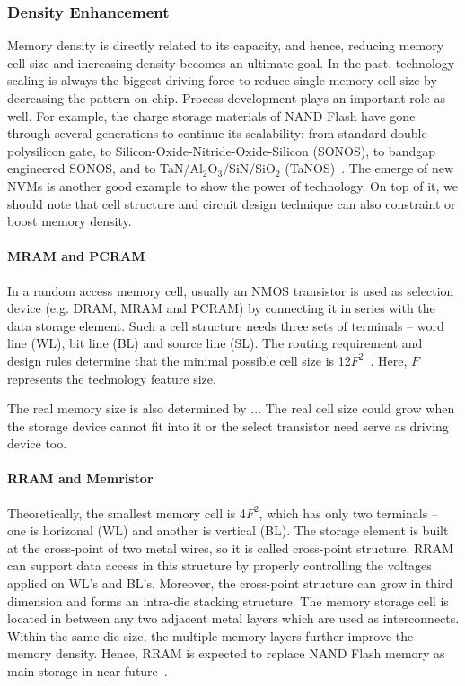\subsubsection{Density Enhancement}

Memory density is directly related to its capacity, and hence, reducing memory cell size and increasing density becomes an ultimate goal. In the past, technology scaling is always the biggest driving force to reduce single memory cell size by decreasing the pattern on chip. Process development plays an important role as well. For example, the charge storage materials of NAND Flash have gone through several generations to continue its scalability: from standard double polysilicon gate, to Silicon-Oxide-Nitride-Oxide-Silicon (SONOS), to bandgap engineered SONOS, and to TaN/Al$_2$O$_3$/SiN/SiO$_2$ (TaNOS)~\cite{Lu09}. The emerge of new NVMs is another good example to show the power of technology. On top of it, we should note that cell structure and circuit design technique can also constraint or boost memory density.

\paragraph{MRAM and PCRAM}

In a random access memory cell, usually an NMOS transistor is used as selection device (e.g. DRAM, MRAM and PCRAM) by connecting it in series with the data storage element. Such a cell structure needs three sets of terminals -- word line (WL), bit line (BL) and source line (SL). The routing requirement and design rules determine that the minimal possible cell size is 12$F^2$~\cite{Li09}. Here, $F$ represents the technology feature size.

The real memory size is also determined by ...
The real cell size could grow when the storage device cannot fit into it or the select transistor need serve as driving device too.



\paragraph{RRAM and Memristor}

Theoretically, the smallest memory cell is 4$F^2$, which has only two terminals -- one is horizonal (WL) and another is vertical (BL). The storage element is built at the cross-point of two metal wires, so it is called cross-point structure. RRAM can support data access in this structure by properly controlling the voltages applied on WL's and BL's. Moreover, the cross-point structure can grow in third dimension and forms an intra-die stacking structure. The memory storage cell is located in between any two adjacent metal layers which are used as interconnects. Within the same die size, the multiple memory layers further improve the memory density. Hence, RRAM is expected to replace NAND Flash memory as main storage in near future~\cite{ITRS07}.

